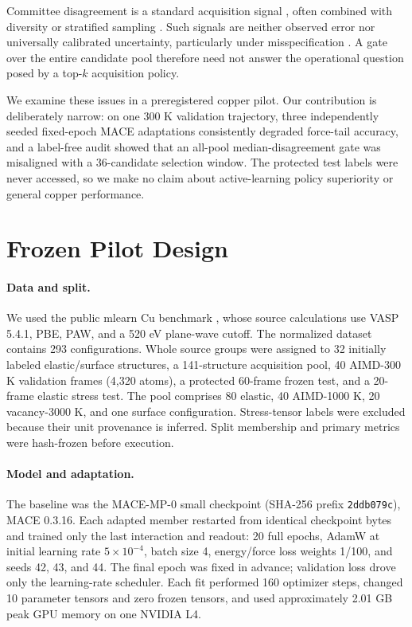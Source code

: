 \documentclass{article}
\begin{document}
Committee disagreement is a standard acquisition signal \citep{schran2020committee}, often combined with diversity or stratified sampling \citep{zaverkin2024uncertainty,qi2024robust}. Such signals are neither observed error nor universally calibrated uncertainty, particularly under misspecification \citep{perez2025misspecified}. A gate over the entire candidate pool therefore need not answer the operational question posed by a top-$k$ acquisition policy.

We examine these issues in a preregistered copper pilot. Our contribution is deliberately narrow: on one 300 K validation trajectory, three independently seeded fixed-epoch MACE adaptations consistently degraded force-tail accuracy, and a label-free audit showed that an all-pool median-disagreement gate was misaligned with a 36-candidate selection window. The protected test labels were never accessed, so we make no claim about active-learning policy superiority or general copper performance.

\section{Frozen Pilot Design}

\paragraph{Data and split.}
We used the public mlearn Cu benchmark \citep{zuo2020performance}, whose source calculations use VASP 5.4.1, PBE, PAW, and a 520 eV plane-wave cutoff. The normalized dataset contains 293 configurations. Whole source groups were assigned to 32 initially labeled elastic/surface structures, a 141-structure acquisition pool, 40 AIMD-300 K validation frames (4,320 atoms), a protected 60-frame frozen test, and a 20-frame elastic stress test. The pool comprises 80 elastic, 40 AIMD-1000 K, 20 vacancy-3000 K, and one surface configuration. Stress-tensor labels were excluded because their unit provenance is inferred. Split membership and primary metrics were hash-frozen before execution.

\paragraph{Model and adaptation.}
The baseline was the MACE-MP-0 small checkpoint (SHA-256 prefix \texttt{2ddb079c}), MACE 0.3.16. Each adapted member restarted from identical checkpoint bytes and trained only the last interaction and readout: 20 full epochs, AdamW at initial learning rate $5\times10^{-4}$, batch size 4, energy/force loss weights 1/100, and seeds 42, 43, and 44. The final epoch was fixed in advance; validation loss drove only the learning-rate scheduler. Each fit performed 160 optimizer steps, changed 10 parameter tensors and zero frozen tensors, and used approximately 2.01 GB peak GPU memory on one NVIDIA L4.
\end{document}
